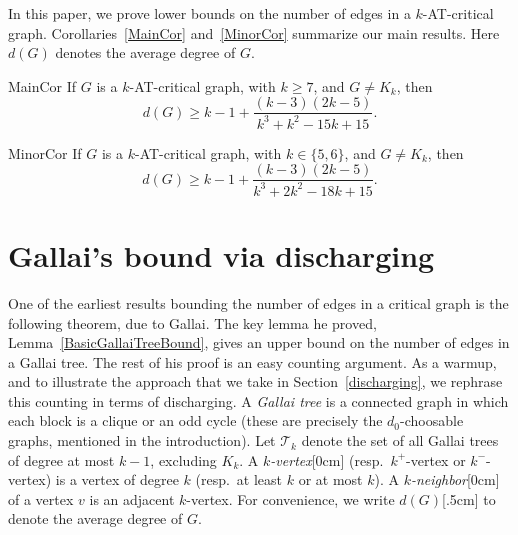 \documentclass[12pt]{article}
\theoremstyle{plain}
\theoremstyle{definition}
\theoremstyle{remark}
\newcommand{\fancy}[1]{\mathcal{#1}}
\newcommand{\T}{\fancy{T}}
\newcommand{\aside}[1]{\marginnote{\scriptsize{#1}}[0cm]}
\newcommand{\aaside}[2]{\marginnote{\scriptsize{#1}}[#2]}
\begin{document}
In this paper, we prove lower bounds on the number of edges in a $k$-AT-critical
graph.  Corollaries~\ref{MainCor} and~\ref{MinorCor} summarize our main results.
Here $d(G)$ denotes the average degree of $G$.

\begin{repcor}{MainCor}
If $G$ is a $k$-AT-critical graph, with $k\ge 7$, and $G\ne K_k$, then
\[d(G) \ge k-1 + \frac{(k-3)(2k-5)}{k^3 + k^2 - 15k + 15}.\]
\end{repcor}


\begin{repcor}{MinorCor}
If $G$ is a $k$-AT-critical graph, with $k\in\{5,6\}$, and $G\ne K_k$, then
\[d(G) \ge k-1 + \frac{(k-3)(2k-5)}{k^3 + 2k^2 - 18k + 15}.\]
\end{repcor}

\section{Gallai's bound via discharging}
\label{sec:gallai}

One of the earliest results bounding the number of edges in a critical graph is
the following theorem, due to Gallai.  The key lemma he proved,
Lemma~\ref{BasicGallaiTreeBound}, gives an upper bound on the number of edges
in a Gallai tree.  The rest of his proof is an easy
counting argument.  As a warmup, and to illustrate the approach that we take in
Section~\ref{discharging}, we rephrase this counting in terms of
discharging.  A \emph{Gallai tree} is a connected graph in which each block is a
clique or an odd cycle (these are precisely the $d_0$-choosable graphs,
mentioned in the introduction).  Let $\T_k$ denote the set of all Gallai
trees of degree at most $k-1$, excluding $K_k$. A
\emph{$k$-vertex}\aside{$k$-vertex} (resp.~$k^+$-vertex or $k^-$-vertex) is a
vertex of degree $k$ (resp.~at least $k$ or at most $k$).  A
\emph{$k$-neighbor}\aside{$k$-neighbor} of a vertex $v$ is an adjacent $k$-vertex.
For convenience, we write $d(G)$\aaside{$d(G)$}{.5cm} to denote the average degree of $G$.
\end{document}
